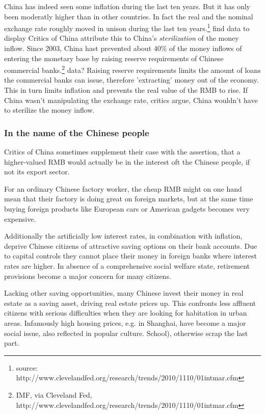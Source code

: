
China has indeed seen some inflation during the last ten years. But it 
has only been moderatly higher than in other countries. In fact the real 
and the nominal exchange rate roughly moved in unison during the last 
ten years.\footnote{source: 
http://www.clevelandfed.org/research/trends/2010/1110/01intmar.cfm}%
find data to display
Critics of China attribute this to China's \emph{sterilization} of the 
money inflow. Since 2003, China hast prevented about 40\% of the money 
inflows of entering the monetary base by raising reserve requirements of 
Chinese commercial banks.\footnote{IMF, via Cleveland Fed, 
http://www.clevelandfed.org/research/trends/2010/1110/01intmar.cfm}%
data?
Raising reserve requirements limits the amount of loans the commercial 
banks can issue, therefore 'extracting' money out of the economy. This 
in turn limits inflation and prevents the real value of the RMB to rise.  
If China wasn't manipulating the exchange rate, critics argue, China 
wouldn't have to sterilize the money inflow.

\subsubsection{In the name of the Chinese people}


Critics of China sometimes supplement their case with the assertion, that a higher-valued RMB would actually be in the interest oft the Chinese people, if not its export sector.

For an ordinary Chinese factory worker, the cheap RMB might on one hand 
mean that their factory is doing great on foreign markets, but at the 
same time buying foreign products like European cars or American gadgets 
becomes very expensive. 

Additionally the artificially low interest rates, in combination with 
inflation, deprive Chinese citizens of attractive saving options on 
their bank accounts. Due to capital controls they cannot place their 
money in foreign banks where interest rates are higher. In absence of a 
comprehensive social welfare state, retirement provisions become a major 
concern for many citizens.

Lacking other saving opportunities, many Chinese invest their money in 
real estate as a saving asset, driving real estate prices up.  This 
confronts less affluent citizens with serious difficulties when they are 
looking for habitation in urban areas.  Infamously high housing prices, 
e.g.  in Shanghai, have become a major social issue, also reflected in 
popular culture. 
School), otherwise scrap the last part.



